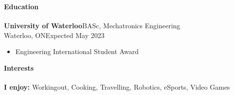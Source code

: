 \documentclass[a4paper]{article}
\newcommand{\lineunder} {
    \vspace{-8pt} \\
    \hspace{-18pt} \hrulefill \\
}
\newcommand{\header} [1] {
    {\hspace{-18pt}\vspace*{6pt} \textcolor{headerGray}{\textbf{\large{#1}}}}
    \vspace{-6pt} \lineunder
}
\begin{document}
\header{Education}
\textbf{\normalsize University of Waterloo}\hfill BASc, Mechatronics Engineering\\
\textcolor{educationGray}{\small Waterloo, ON\hfill Expected May 2023}
\vspace{-2mm}
\begin{itemize}[leftmargin=1cm]\itemsep -0.5pt
	\item Engineering International Student Award
\end{itemize}
\vspace{1mm}

\header{Interests}
\textbf{I enjoy: } Workingout, Cooking, Travelling, Robotics, eSports, Video Games\\
\end{document}

